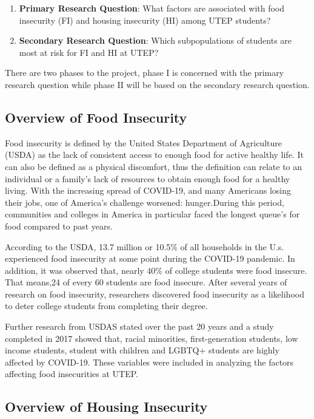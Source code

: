 \documentclass[
  10pt,
]{article}
\begin{document}
\begin{enumerate}
\def\labelenumi{\arabic{enumi}.}
\item
  \textbf{Primary Research Question}: What factors are associated with food insecurity (FI) and housing insecurity (HI) among UTEP students?
\item
  \textbf{Secondary Research Question}: Which subpopulations of students are most at risk for FI and HI at UTEP?
\end{enumerate}

There are two phases to the project, phase I is concerned with the primary research question while phase II will be based on the secondary research question.

\hypertarget{overview-of-food-insecurity}{%
\subsection{Overview of Food Insecurity}\label{overview-of-food-insecurity}}

Food insecurity is defined by the United States Department of Agriculture (USDA) as the lack of consistent access to enough food for active healthy life. It can also be defined as a physical discomfort, thus the definition can relate to an individual or a family's lack of resources to obtain enough food for a healthy living. With the increasing spread of COVID-19, and many Americans losing their jobs, one of America's challenge worsened: hunger.During this period, communities and colleges in America in particular faced the longest queue's for food compared to past years.

According to the USDA, 13.7 million or 10.5\% of all households in the U.s. experienced food insecurity at some point during the COVID-19 pandemic. In addition, it was observed that, nearly 40\% of college students were food insecure. That means,24 of every 60 students are food insecure. After several years of research on food insecurity, researchers discovered food insecurity as a likelihood to deter college students from completing their degree.

Further research from USDAS stated over the past 20 years and a study completed in 2017 showed that, racial minorities, first-generation students, low income students, student with children and LGBTQ+ students are highly affected by COVID-19. These variables were included in analyzing the factors affecting food insecurities at UTEP.

\hypertarget{overview-of-housing-insecurity}{%
\subsection{Overview of Housing Insecurity}\label{overview-of-housing-insecurity}}
\end{document}
